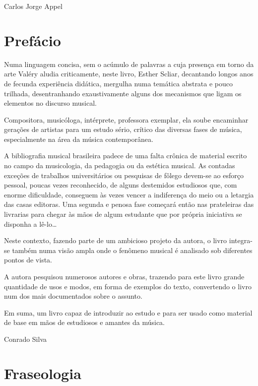 \documentclass[a4paper]{book}
\begin{document}
\begin{flushright}
Carlos Jorge Appel
\end{flushright}

\chapter*{Prefácio}

Numa linguagem concisa, sem o acúmulo de palavras a cuja presença em torno da arte Valéry aludia criticamente, neste livro, Esther Scliar, decantando longos anos de fecunda experiência didática, mergulha numa temática abstrata e pouco trilhada, desentranhando exaustivamente alguns dos mecanismos que ligam os elementos no discurso musical.

Compositora, musicóloga, intérprete, professora exemplar, ela soube encaminhar gerações de artistas para um estudo sério, crítico das diversas fases de música, especialmente na área da música contemporânea.

A bibliografia musical brasileira padece de uma falta crônica de material escrito no campo da musicologia, da pedagogia ou da estética musical. As contadas exceções de trabalhos universitários ou pesquisas de fôlego devem-se ao esforço pessoal, poucas vezes reconhecido, de alguns destemidos estudiosos que, com enorme dificuldade, conseguem às vezes vencer a indiferença do meio ou a letargia das casas editoras. Uma segunda e penosa fase começará então nas prateleiras das livrarias para chegar às mãos de algum estudante que por própria iniciativa se disponha a lê-lo\ldots

Neste contexto, fazendo parte de um ambicioso projeto da autora, o livro integra-se também numa visão ampla onde o fenômeno musical é analisado sob diferentes pontos de vista.

A autora pesquisou numerosos autores e obras, trazendo para este livro grande quantidade de usos e modos, em forma de exemplos do texto, convertendo o livro num dos mais documentados sobre o assunto.

Em suma, um livro capaz de introduzir ao estudo e para ser usado como material de base em mãos de estudiosos e amantes da música.

\begin{flushright}
Conrado Silva
\end{flushright}

\chapter*{Fraseologia}
\end{document}
